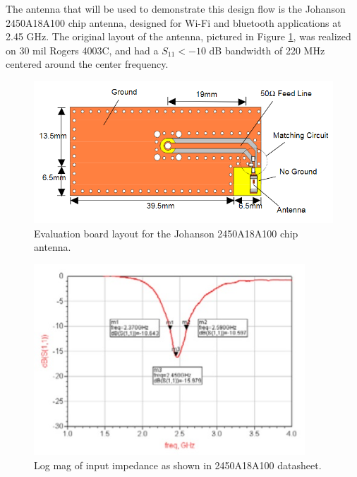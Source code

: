 \documentclass[12pt]{usfcoe}
\begin{document}
    The antenna that will be used to demonstrate this design flow is the Johanson 2450A18A100 chip antenna, designed for Wi-Fi and bluetooth applications at 2.45 GHz.
    The original layout of the antenna, pictured in Figure \ref{fig:2450_dev_board}, was realized on 30 mil Rogers 4003C, and had a $S_{11}< -10 $ dB bandwidth of 220 MHz centered around the center frequency. 
    
    
    \begin{figure}[H]
		\begin{center}
        	\includegraphics[width=\textwidth]{images/2450_reconfig/2450_dev_board.png} 
			\caption{Evaluation board layout for the Johanson 2450A18A100 chip antenna.} 
			\label{fig:2450_dev_board}
		\end{center}
	\end{figure}    
	
    \begin{figure}[H]
		\begin{center}
        	\includegraphics[width=4in]{images/2450_reconfig/datasheet_response.jpg} 
			\caption{Log mag of input impedance as shown in 2450A18A100 datasheet.} 
			\label{fig:datasheet_s11}
		\end{center}
	\end{figure}    
	
\end{document}
